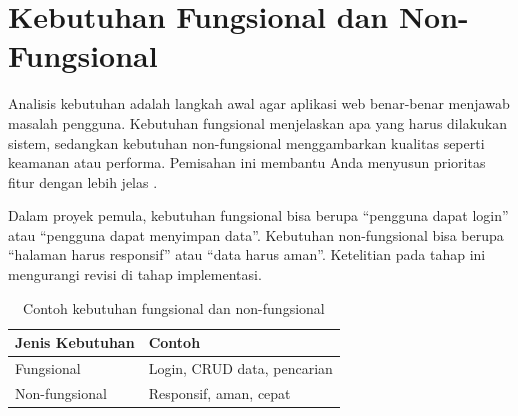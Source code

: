 \section{Kebutuhan Fungsional dan Non-Fungsional}
Analisis kebutuhan adalah langkah awal agar aplikasi web benar-benar menjawab masalah pengguna. Kebutuhan fungsional menjelaskan apa yang harus dilakukan sistem, sedangkan kebutuhan non-fungsional menggambarkan kualitas seperti keamanan atau performa. Pemisahan ini membantu Anda menyusun prioritas fitur dengan lebih jelas \cite{mdnLearn}.

Dalam proyek pemula, kebutuhan fungsional bisa berupa ``pengguna dapat login'' atau ``pengguna dapat menyimpan data''. Kebutuhan non-fungsional bisa berupa ``halaman harus responsif'' atau ``data harus aman''. Ketelitian pada tahap ini mengurangi revisi di tahap implementasi.

\begin{table}[ht]
\centering
\begin{tabular}{|P{5cm}|P{6cm}|}
\hline
\textbf{Jenis Kebutuhan} & \textbf{Contoh} \\
\hline
Fungsional & Login, CRUD data, pencarian \\
\hline
Non-fungsional & Responsif, aman, cepat \\
\hline
\end{tabular}
\caption{Contoh kebutuhan fungsional dan non-fungsional}
\end{table}

